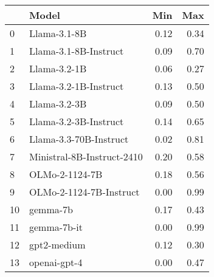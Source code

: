 \begin{tabular}{llrr}
\toprule
 & Model & Min & Max \\
\midrule
0 & Llama-3.1-8B & 0.12 & 0.34 \\
1 & Llama-3.1-8B-Instruct & 0.09 & 0.70 \\
2 & Llama-3.2-1B & 0.06 & 0.27 \\
3 & Llama-3.2-1B-Instruct & 0.13 & 0.50 \\
4 & Llama-3.2-3B & 0.09 & 0.50 \\
5 & Llama-3.2-3B-Instruct & 0.14 & 0.65 \\
6 & Llama-3.3-70B-Instruct & 0.02 & 0.81 \\
7 & Ministral-8B-Instruct-2410 & 0.20 & 0.58 \\
8 & OLMo-2-1124-7B & 0.18 & 0.56 \\
9 & OLMo-2-1124-7B-Instruct & 0.00 & 0.99 \\
10 & gemma-7b & 0.17 & 0.43 \\
11 & gemma-7b-it & 0.00 & 0.99 \\
12 & gpt2-medium & 0.12 & 0.30 \\
13 & openai-gpt-4 & 0.00 & 0.47 \\
\bottomrule
\end{tabular}
